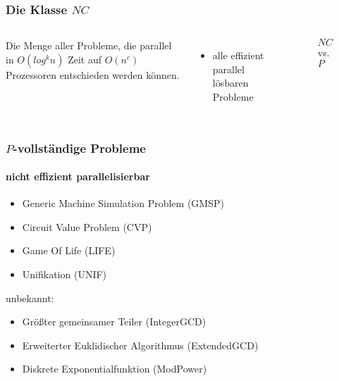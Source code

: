 \begin{frame}
    \frametitle{Die Klasse $NC$}
    \begin{columns}
        \begin{definition}[$NC$]
            Die Menge aller Probleme, die parallel
            in $O(log^k n)$ Zeit auf $O(n^c)$ Prozessoren entschieden werden können.
        \end{definition}
        \begin{itemize}
            \item alle effizient parallel lösbaren Probleme
        \end{itemize}
        \begin{figure}
            \centering
            
            \caption{$NC$ vs. $P$}
        \end{figure}
    \end{columns}
\end{frame}

\begin{frame}
    \frametitle{$P$-vollständige Probleme}
    \framesubtitle{nicht effizient parallelisierbar}
    \begin{itemize}
        \item Generic Machine Simulation Problem (GMSP)
        \item Circuit Value Problem (CVP)
        \item Game Of Life (LIFE)
        \item Unifikation (UNIF)
    \end{itemize}
    unbekannt:
    \begin{itemize}
        \item Größter gemeinsamer Teiler (IntegerGCD)
        \item Erweiterter Euklidischer Algorithmus (ExtendedGCD)
        \item Diskrete Exponentialfunktion (ModPower)
    \end{itemize}
\end{frame}
